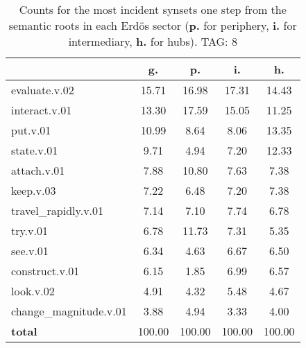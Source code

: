 \begin{table}[h!]
\begin{center}
\begin{tabular}{| l || c | c | c | c |}\hline
 & {\bf g.} & {\bf p.} & {\bf i.} & {\bf h.} \\\hline\hline
evaluate.v.02 & 15.71  & 16.98  & 17.31  & 14.43 \\\hline
interact.v.01 & 13.30  & 17.59  & 15.05  & 11.25 \\\hline
put.v.01 & 10.99  & 8.64  & 8.06  & 13.35 \\\hline
state.v.01 & 9.71  & 4.94  & 7.20  & 12.33 \\\hline
attach.v.01 & 7.88  & 10.80  & 7.63  & 7.38 \\\hline
keep.v.03 & 7.22  & 6.48  & 7.20  & 7.38 \\\hline
travel\_rapidly.v.01 & 7.14  & 7.10  & 7.74  & 6.78 \\\hline
try.v.01 & 6.78  & 11.73  & 7.31  & 5.35 \\\hline
see.v.01 & 6.34  & 4.63  & 6.67  & 6.50 \\\hline
construct.v.01 & 6.15  & 1.85  & 6.99  & 6.57 \\\hline
look.v.02 & 4.91  & 4.32  & 5.48  & 4.67 \\\hline
change\_magnitude.v.01 & 3.88  & 4.94  & 3.33  & 4.00 \\\hline\hline
{{\bf total}} & 100.00  & 100.00  & 100.00  & 100.00 \\\hline
\end{tabular}
\caption{Counts for the most incident synsets one step from the semantic roots in each Erd\"os sector ({\bf p.} for periphery, {\bf i.} for intermediary, {\bf h.} for hubs). TAG: 8}
\end{center}
\end{table}